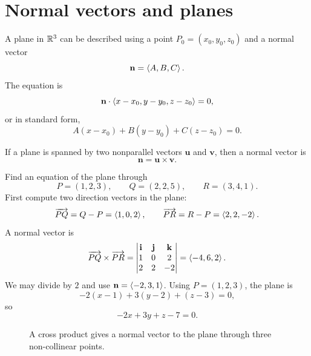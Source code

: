 \section{Normal vectors and planes}

A plane in $\mathbb{R}^3$ can be described using a point $P_0=(x_0,y_0,z_0)$ and a normal vector
\[
\mathbf n=\left\langle A,B,C\right\rangle.
\]
The equation is
\[
\mathbf n\cdot\left\langle x-x_0,y-y_0,z-z_0\right\rangle=0,
\]
or in standard form,
\[
A(x-x_0)+B(y-y_0)+C(z-z_0)=0.
\]

If a plane is spanned by two nonparallel vectors $\mathbf u$ and $\mathbf v$, then a normal vector is
\[
\mathbf n=\mathbf u\times\mathbf v.
\]

\begin{examplebox}[title={Example 5.3: Plane through three points}]
Find an equation of the plane through
\[
P=(1,2,3),\qquad Q=(2,2,5),\qquad R=(3,4,1).
\]
First compute two direction vectors in the plane:
\[
\overrightarrow{PQ}=Q-P=\left\langle 1,0,2\right\rangle,
\qquad
\overrightarrow{PR}=R-P=\left\langle 2,2,-2\right\rangle.
\]
A normal vector is
\[
\overrightarrow{PQ}\times\overrightarrow{PR}
=
\begin{vmatrix}
\mathbf i&\mathbf j&\mathbf k\\
1&0&2\\
2&2&-2
\end{vmatrix}
=\left\langle -4,6,2\right\rangle.
\]
We may divide by $2$ and use $\mathbf n=\left\langle -2,3,1\right\rangle$. Using $P=(1,2,3)$, the plane is
\[
-2(x-1)+3(y-2)+(z-3)=0,
\]
so
\[
-2x+3y+z-7=0.
\]
\end{examplebox}

\begin{figure}[H]
\centering
{}
\caption{A cross product gives a normal vector to the plane through three non-collinear points.}
\label{fig:plane-from-cross-product}
\end{figure}

